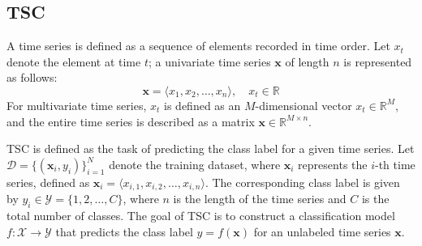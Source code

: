 \documentclass[conference]{IEEEtran}
\begin{document}
\subsection{TSC}
A time series is defined as a sequence of elements recorded in time order. Let $x_t$ denote the element at time $t$; a univariate time series $\mathbf{x}$ of length $n$ is represented as follows:
$$\mathbf{x} = \langle x_1, x_2, \dots, x_n \rangle, \quad x_t \in \mathbb{R}$$
For multivariate time series, $x_t$ is defined as an $M$-dimensional vector $x_t \in \mathbb{R}^M$, and the entire time series is described as a matrix $\mathbf{x} \in \mathbb{R}^{M \times n}$.

TSC is defined as the task of predicting the class label for a given time series.
Let $\mathcal{D} = \{(\mathbf{x}_i, y_i)\}_{i=1}^N$ denote the training dataset, where $\mathbf{x}_i$ represents the $i$-th time series, defined as $\mathbf{x}_i = \langle x_{i,1}, x_{i,2}, \dots, x_{i,n} \rangle$. The corresponding class label is given by $y_i \in \mathcal{Y} = \{1, 2, \dots, C\}$, where $n$ is the length of the time series and $C$ is the total number of classes. The goal of TSC is to construct a classification model $f: \mathcal{X} \to \mathcal{Y}$ that predicts the class label $y = f(\mathbf{x})$ for an unlabeled time series $\mathbf{x}$.
\end{document}
